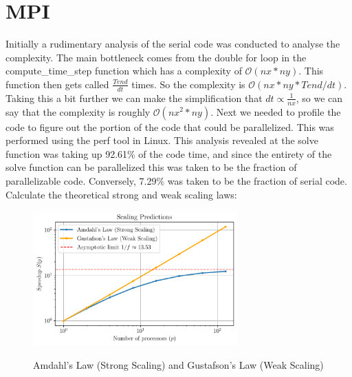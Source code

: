 \section{MPI}
Initially a rudimentary analysis of the serial code was conducted to analyse the complexity. The main bottleneck comes
from the double for loop in the compute\_time\_step function which has a complexity of $\mathcal{O}(nx*ny)$. This function
then gets called $\frac{Tend}{dt}$ times. So the complexity is $\mathcal{O}(nx*ny*Tend/dt)$. Taking this a bit further
we can make the simplification that $dt \propto \frac{1}{nx}$, so we can say that the complexity is roughly
$\mathcal{O}(nx^2*ny)$. Next we needed to profile the code to figure out the portion of the code that could be
parallelized. This was performed using the perf tool in Linux. This analysis revealed at the solve function was taking
up 92.61\% of the code time, and since the entirety of the solve function can be parallelized this was taken to be the
fraction of parallelizable code. Conversely, 7.29\% was taken to be the fraction of serial code. Calculate the
theoretical strong and weak scaling laws:

\begin{figure}[h!]
    \centering
    \includegraphics[width=0.7\textwidth]{./plots/scaling_laws.pdf}\\[1cm]
    \caption{Amdahl's Law (Strong Scaling) and Gustafson's Law (Weak Scaling)}
\end{figure}
\FloatBarrier

